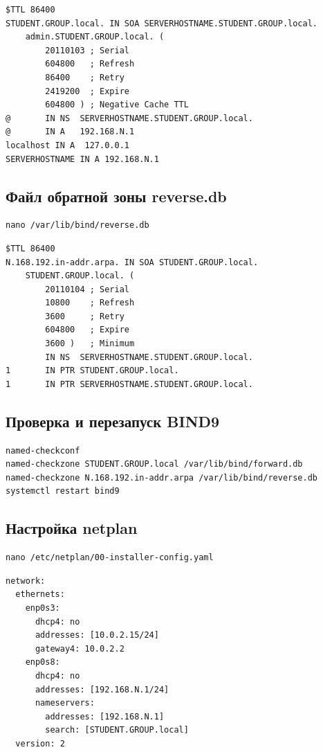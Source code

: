 \begin{lstlisting}
$TTL 86400
STUDENT.GROUP.local. IN SOA SERVERHOSTNAME.STUDENT.GROUP.local.
    admin.STUDENT.GROUP.local. (
        20110103 ; Serial
        604800   ; Refresh
        86400    ; Retry
        2419200  ; Expire
        604800 ) ; Negative Cache TTL
@       IN NS  SERVERHOSTNAME.STUDENT.GROUP.local.
@       IN A   192.168.N.1
localhost IN A  127.0.0.1
SERVERHOSTNAME IN A 192.168.N.1
\end{lstlisting}

\subsection{Файл обратной зоны reverse.db}

\begin{lstlisting}
nano /var/lib/bind/reverse.db
\end{lstlisting}

\begin{lstlisting}
$TTL 86400
N.168.192.in-addr.arpa. IN SOA STUDENT.GROUP.local.
    STUDENT.GROUP.local. (
        20110104 ; Serial
        10800    ; Refresh
        3600     ; Retry
        604800   ; Expire
        3600 )   ; Minimum
        IN NS  SERVERHOSTNAME.STUDENT.GROUP.local.
1       IN PTR STUDENT.GROUP.local.
1       IN PTR SERVERHOSTNAME.STUDENT.GROUP.local.
\end{lstlisting}

\subsection{Проверка и перезапуск BIND9}

\begin{lstlisting}
named-checkconf
named-checkzone STUDENT.GROUP.local /var/lib/bind/forward.db
named-checkzone N.168.192.in-addr.arpa /var/lib/bind/reverse.db
systemctl restart bind9
\end{lstlisting}

\subsection{Настройка netplan}

\begin{lstlisting}
nano /etc/netplan/00-installer-config.yaml
\end{lstlisting}

\begin{lstlisting}
network:
  ethernets:
    enp0s3:
      dhcp4: no
      addresses: [10.0.2.15/24]
      gateway4: 10.0.2.2
    enp0s8:
      dhcp4: no
      addresses: [192.168.N.1/24]
      nameservers:
        addresses: [192.168.N.1]
        search: [STUDENT.GROUP.local]
  version: 2
\end{lstlisting}

